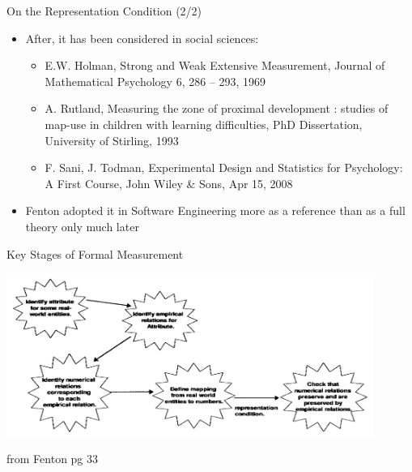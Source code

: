 \documentclass{beamer}
\begin{document}
\begin{frame}{\centerline{ On the Representation Condition (2/2)}}


\begin{itemize}
\item After, it has been considered in social sciences: 
\begin{itemize}
\item E.W. Holman, Strong and Weak Extensive Measurement, Journal of Mathematical Psychology 6, 286 -- 293, 1969
\item A. Rutland, Measuring the zone of proximal development : studies of map-use in children with learning difficulties, PhD Dissertation, University of Stirling, 1993
\item F. Sani, J. Todman, Experimental Design and Statistics for Psychology: A First Course, John Wiley \& Sons, Apr 15, 2008 
\end{itemize}
\item Fenton adopted it in Software Engineering more as a reference than as a full theory only much later
\end{itemize}


\end{frame}



\begin{frame}{\centerline{Key Stages of Formal Measurement}}

\begin{center}
\includegraphics[width=120mm]{A2022.IDSEPC.SperimentazioneDeduzione/img-img13.png}
\newline
\end{center}

\begin{small}
\begin{center}
from Fenton pg 33
\end{center}
\end{small}
\end{frame}
\end{document}
